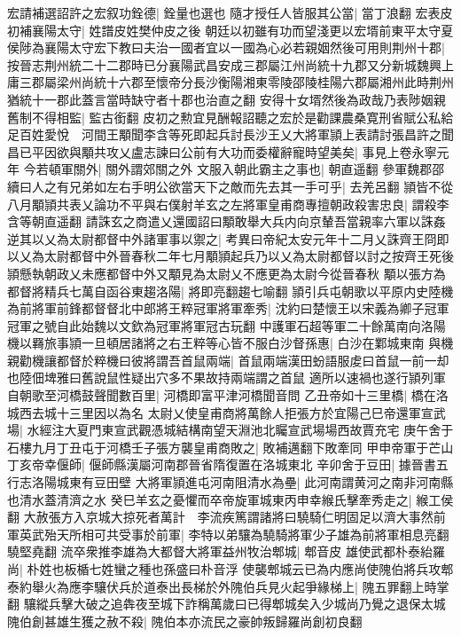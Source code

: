 宏請補選詔許之宏叙功銓德|{
	銓量也選也}
隨才授任人皆服其公當|{
	當丁浪翻}
宏表皮初補襄陽太守|{
	姓譜皮姓樊仲皮之後}
朝廷以初雖有功而望淺更以宏壻前東平太守夏侯陟為襄陽太守宏下教曰夫治一國者宜以一國為心必若親姻然後可用則荆州十郡|{
	按晉志荆州統二十二郡時已分襄陽武昌安成三郡屬江州尚統十九郡又分新城魏興上庸三郡屬梁州尚統十六郡至懷帝分長沙衡陽湘東零陵邵陵桂陽六郡屬湘州此時荆州猶統十一郡此蓋言當時缺守者十郡也治直之翻}
安得十女壻然後為政哉乃表陟姻親舊制不得相監|{
	監古銜翻}
皮初之勲宜見酬報詔聽之宏於是勸課農桑寛刑省賦公私給足百姓愛悅　河間王顒聞李含等死即起兵討長沙王乂大將軍頴上表請討張昌許之聞昌已平因欲與顒共攻乂盧志諫曰公前有大功而委權辭寵時望美矣|{
	事見上卷永寧元年}
今若頓軍關外|{
	關外謂郊關之外}
文服入朝此霸主之事也|{
	朝直遥翻}
參軍魏郡邵續曰人之有兄弟如左右手明公欲當天下之敵而先去其一手可乎|{
	去羌呂翻}
頴皆不從八月顒頴共表乂論功不平與右僕射羊玄之左將軍皇甫商專擅朝政殺害忠良|{
	謂殺李含等朝直遥翻}
請誅玄之商遣乂還國詔曰顒敢舉大兵内向京輦吾當親率六軍以誅姦逆其以乂為太尉都督中外諸軍事以禦之|{
	考異曰帝紀太安元年十二月乂誅齊王冏即以乂為太尉都督中外晉春秋二年七月顒頴起兵乃以乂為太尉都督以討之按齊王死後頴懸執朝政乂未應都督中外又顒見為太尉乂不應更為太尉今從晉春秋}
顒以張方為都督將精兵七萬自函谷東趨洛陽|{
	將即亮翻趨七喻翻}
頴引兵屯朝歌以平原内史陸機為前將軍前鋒都督督北中郎將王粹冠軍將軍牽秀|{
	沈約曰楚懷王以宋義為卿子冠軍冠軍之號自此始魏以文欽為冠軍將軍冠古玩翻}
中護軍石超等軍二十餘萬南向洛陽機以羇旅事頴一旦頓居諸將之右王粹等心皆不服白沙督孫惠|{
	白沙在鄴城東南}
與機親勸機讓都督於粹機曰彼將謂吾首鼠兩端|{
	首鼠兩端漢田蚡語服䖍曰首鼠一前一却也陸佃埤雅曰舊說鼠性疑出穴多不果故持兩端謂之首鼠}
適所以速禍也遂行頴列軍自朝歌至河橋鼓聲聞數百里|{
	河橋即富平津河橋聞音問}
乙丑帝如十三里橋|{
	橋在洛城西去城十三里因以為名}
太尉乂使皇甫商將萬餘人拒張方於宜陽己巳帝還軍宣武場|{
	水經注大夏門東宣武觀憑城結構南望天淵池北矚宣武場場西故賈充宅}
庚午舍于石樓九月丁丑屯于河橋壬子張方襲皇甫商敗之|{
	敗補邁翻下敗牽同}
甲申帝軍于芒山丁亥帝幸偃師|{
	偃師縣漢屬河南郡晉省隋復置在洛城東北}
辛卯舍于豆田|{
	據晉書五行志洛陽城東有豆田壁}
大將軍頴進屯河南阻清水為壘|{
	此河南謂黄河之南非河南縣也清水蓋清濟之水}
癸巳羊玄之憂懼而卒帝旋軍城東丙申幸緱氏擊牽秀走之|{
	緱工侯翻}
大赦張方入京城大掠死者萬計　李流疾篤謂諸將曰驍騎仁明固足以濟大事然前軍英武殆天所相可共受事於前軍|{
	李特以弟驤為驍騎將軍少子雄為前將軍相息亮翻驍堅堯翻}
流卒衆推李雄為大都督大將軍益州牧治郫城|{
	郫音皮}
雄使武都朴泰紿羅尚|{
	朴姓也板楯七姓蠻之種也孫盛曰朴音浮}
使襲郫城云已為内應尚使隗伯將兵攻郫泰約舉火為應李驤伏兵於道泰出長梯於外隗伯兵見火起爭緣梯上|{
	隗五罪翻上時掌翻}
驤縱兵擊大破之追犇夜至城下詐稱萬歲曰已得郫城矣入少城尚乃覺之退保太城隗伯創甚雄生獲之赦不殺|{
	隗伯本亦流民之豪帥叛歸羅尚創初良翻}
